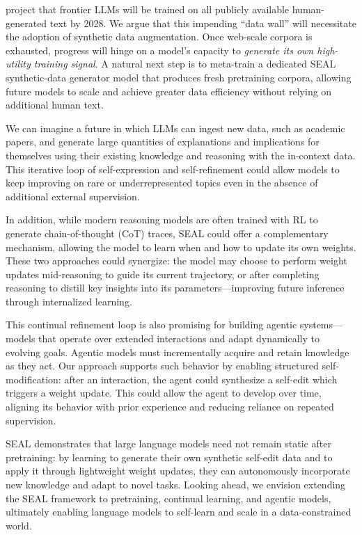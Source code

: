 \documentclass{article}
\newcommand{\methodacronym}{SEAL\xspace}
\begin{document}
\citet{villalobos2024rundatalimitsllm} project that frontier LLMs will be trained on all publicly available human-generated text by 2028. We argue that this impending ``data wall'' will necessitate the adoption of synthetic data augmentation. Once web-scale corpora is exhausted, progress will hinge on a model's capacity to \textit{generate its own high-utility training signal}. A natural next step is to meta-train a dedicated \methodacronym{} synthetic-data generator model that produces fresh pretraining corpora, allowing future models to scale and achieve greater data efficiency without relying on additional human text.

We can imagine a future in which LLMs can ingest new data, such as academic papers, and generate large quantities of explanations and implications for themselves using their existing knowledge and reasoning with the in-context data. This iterative loop of self-expression and self-refinement could allow models to keep improving on rare or underrepresented topics even in the absence of additional external supervision.

In addition, while modern reasoning models are often trained with RL to generate chain-of-thought (CoT) traces, \methodacronym could offer a complementary mechanism, allowing the model to learn when and how to update its own weights. These two approaches could synergize: the model may choose to perform weight updates mid-reasoning to guide its current trajectory, or after completing reasoning to distill key insights into its parameters---improving future inference through internalized learning.

This continual refinement loop is also promising for building agentic systems---models that operate over extended interactions and adapt dynamically to evolving goals. Agentic models must incrementally acquire and retain knowledge as they act. Our approach supports such behavior by enabling structured self-modification: after an interaction, the agent could synthesize a self-edit which triggers a weight update. This could allow the agent to develop over time, aligning its behavior with prior experience and reducing reliance on repeated supervision. 

\methodacronym demonstrates that large language models need not remain static after pretraining: by learning to generate their own synthetic self-edit data and to apply it through lightweight weight updates, they can autonomously incorporate new knowledge and adapt to novel tasks. Looking ahead, we envision extending the \methodacronym framework to pretraining, continual learning, and agentic models, ultimately enabling language models to self-learn and scale in a data-constrained world.
\end{document}
